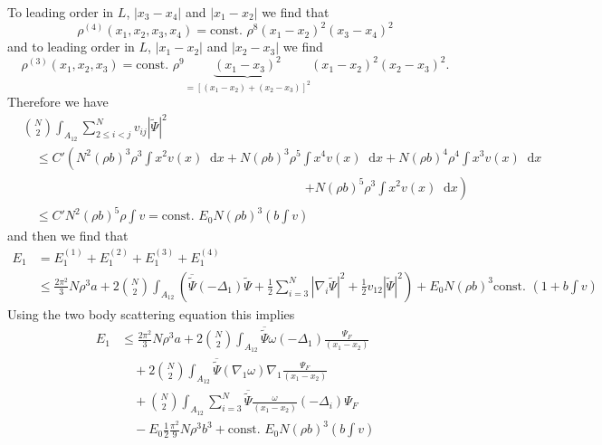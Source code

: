 \documentclass[a4paper,11pt]{article}
\newcommand{\abs}[1]{\left\lvert #1 \right\rvert}
\newcommand*\diff{\mathop{}\!\mathrm{d}}
\numberwithin{equation}{section}
\begin{document}
		To leading order in $ L $, $ \abs{x_3-x_4} $ and $ \abs{x_1-x_2} $ we find that \begin{equation}
		\rho^{(4)}(x_1,x_2,x_3,x_4)=\text{const. }\rho^8(x_1-x_2)^2(x_3-x_4)^2
		\end{equation}
		and to leading order in $ L $, $ \abs{x_1-x_2} $ and $ \abs{x_2-x_3} $ we find \begin{equation}
		\rho^{(3)}(x_1,x_2,x_3)=\text{const. }\rho^9\underbrace{(x_1-x_3)^2}_{=[(x_1-x_2)+(x_2-x_3)]^2}(x_1-x_2)^2(x_2-x_3)^2.
		\end{equation}
		Therefore we have
		\begin{equation}
		\begin{aligned}
		&\binom{N}{2}\int_{A_{12}} \sum_{2\leq i<j}^{N}v_{ij}\abs{\tilde{\Psi}}^2\\&\quad\leq C' \left(N^2(\rho b)^3\rho^3\int x^2 v(x)\diff x+N(\rho b)^3 \rho^5 \int x^4 v(x)\diff x+N(\rho b)^4\rho^4 \int x^3 v(x)\diff x\right.\\
		&\qquad \qquad \qquad \qquad\hspace{6cm}\left.+N(\rho b)^5 \rho^3 \int x^2 v(x)\diff x\right)\\
		&\quad \leq C' N^2(\rho b)^5\rho \int v=\text{const. }E_0 N (\rho b)^3 \left(b\int v\right)
		\end{aligned}
		\end{equation}
		and then we find that \begin{equation}
		\begin{aligned}
		E_1&=E_1^{(1)}+E_1^{(2)}+E_1^{(3)}+E_1^{(4)}\\&\leq \frac{2\pi^2}{3}N\rho^3 a+2\binom{N}{2}\int_{A_{12}}\left(\overline{\tilde{\Psi}}(-\Delta_1)\tilde{\Psi}+\frac{1}{2}\sum_{i=3}^{N}\abs{\nabla_i\tilde{\Psi}}^2+\frac{1}{2}v_{12}\abs{\tilde{\Psi}}^2\right)+E_0N(\rho b)^3\text{const. }\left(1+b \int v\right)
		\end{aligned}
		\end{equation}
		Using the two body scattering equation this implies \begin{equation}
		\begin{aligned}
		E_1&\leq \frac{2\pi^2}{3}N\rho^3 a+2\binom{N}{2}\int_{A_{12}}\overline{\tilde{\Psi}}\omega(-\Delta_1)\frac{\Psi_F}{(x_1-x_2)}\\&\quad+2\binom{N}{2}\int_{A_{12}}\overline{\tilde{\Psi}}(\nabla_1\omega)\nabla_1\frac{\Psi_F}{(x_1-x_2)}\\
		&\quad +\binom{N}{2}\int_{A_{12}}\sum_{i=3}^{N} \overline{\tilde{\Psi}}\frac{\omega}{(x_1-x_2)}(-\Delta_i)\Psi_F
		\\&\quad-E_0\frac{1}{2}\frac{\pi^2}{9}N\rho^3b^3+\text{const. }E_0 N (\rho b)^3 \left(b\int v\right)
		\end{aligned}
		\end{equation}
\end{document}
